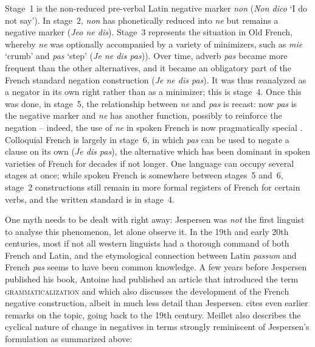 \documentclass[output=chapter]{langscibook}
\begin{document}
Stage~1 is the non-reduced pre-verbal Latin negative marker \textit{non} (\textit{Non dico} `I do not say’). In stage~2, \textit{non} has phonetically reduced into \textit{ne} but remains a negative marker (\textit{Jeo ne dis}). Stage~3 represents the situation in Old French, whereby \textit{ne} was optionally accompanied by a variety of minimizers, such as \textit{mie} `crumb’ and \textit{pas} `step’ (\textit{Je ne dis {\op}pas})). Over time, adverb \textit{pas} became more frequent than the other alternatives, and it became an obligatory part of the French standard negation construction (\textit{Je ne dis pas}). It was thus reanalyzed as a negator in its own right rather than as a minimizer; this is stage~4. Once this was done, in stage~5, the relationship between \textit{ne} and \textit{pas} is recast: now \textit{pas} is the negative marker and \textit{ne} has another function, possibly to reinforce the negation -- indeed, the use of \textit{ne} in spoken French is now pragmatically special \citep{FonsecaGreber2007}. Colloquial French is largely in stage~6, in which \textit{pas} can be used to negate a clause on its own (\textit{Je dis pas}), the alternative which has been dominant in spoken varieties of French for decades if not longer. One language can occupy several stages at once; while spoken French is somewhere between stages~5 and~6, stage~2 constructions still remain in more formal registers of French for certain verbs, and the written standard is in stage~4.

One myth needs to be dealt with right away: Jespersen was \textit{not} the first linguist to analyse this phenomenon, let alone observe it. In the 19th and early 20th centuries, most if not all western linguists had a thorough command of both French and Latin, and the etymological connection between Latin \textit{passum} and French \textit{pas} seems to have been common knowledge. A few years before Jespersen published his book, Antoine \citet{Meillet1912} had published an article that introduced the term \textsc{grammaticalization} and which also discusses the development of the French negative construction, albeit in much less detail than Jespersen.  cites even earlier remarks on the topic, going back to the 19th century. Meillet also describes the cyclical nature of change in negatives in terms strongly reminiscent of Jespersen’s formulation as summarized above:
\end{document}

